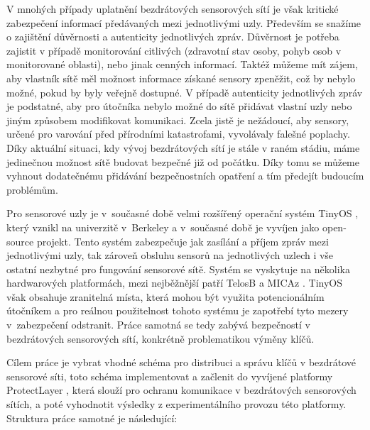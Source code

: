 \documentclass[11pt,final,twoside]{fithesis2}
\begin{document}
V mnohých případy uplatnění bezdrátových sensorových sítí je však kritické zabezpečení informací předávaných mezi jednotlivými uzly. Především se snažíme o zajištění důvěrnosti a autenticity jednotlivých 
zpráv. Důvěrnost je potřeba zajistit v případě monitorování citlivých (zdravotní stav osoby, pohyb osob v monitorované oblasti), nebo jinak cenných informací. Taktéž můžeme mít zájem, aby vlastník sítě měl 
možnost informace získané sensory zpeněžit, což by nebylo možné, pokud by byly veřejně dostupné. V případě autenticity jednotlivých zpráv je podstatné, aby pro útočníka nebylo možné do sítě přidávat vlastní 
uzly nebo jiným způsobem modifikovat komunikaci. Zcela jistě je nežádoucí, aby sensory, určené pro varování před přírodními katastrofami, vyvolávaly falešné poplachy. Díky aktuální situaci, kdy vývoj 
bezdrátových sítí je stále v raném stádiu, máme jedinečnou možnost sítě budovat bezpečné již od počátku. Díky tomu se můžeme vyhnout dodatečnému přidávání bezpečnostních opatření a tím předejít 
budoucím problémům.

Pro sensorové uzly je v~současné době velmi rozšířený operační systém TinyOS \cite{Levis2005}, který vznikl na univerzitě v~Berkeley a v~současné době je vyvíjen jako open-source projekt.  Tento systém 
zabezpečuje jak zasílání a příjem zpráv mezi jednotlivými uzly, tak zároveň obsluhu sensorů na jednotlivých uzlech i vše ostatní nezbytné pro fungování sensorové sítě. Systém se vyskytuje na několika 
hardwarových platformách, mezi nejběžnější patří TelosB a MICAz \cite{Inc.}\cite{MemsicInc.}. TinyOS však obsahuje zranitelná místa, která mohou být využita potencionálním útočníkem \cite{Drexler2010} a pro 
reálnou použitelnost tohoto systému je zapotřebí tyto mezery v~zabezpečení odstranit. Práce samotná se tedy zabývá bezpečností v bezdrátových sensorových sítí, konkrétně problematikou výměny klíčů.

Cílem práce je vybrat vhodné schéma pro distribuci a správu klíčů v bezdrátové sensorové síti, toto schéma implementovat a začlenit do vyvíjené platformy ProtectLayer \cite{Svenda2014a}, která slouží pro 
ochranu komunikace v bezdrátových sensorových sítích, a poté vyhodnotit výsledky z experimentálního provozu této platformy. Struktura práce samotné je následující:
\end{document}
